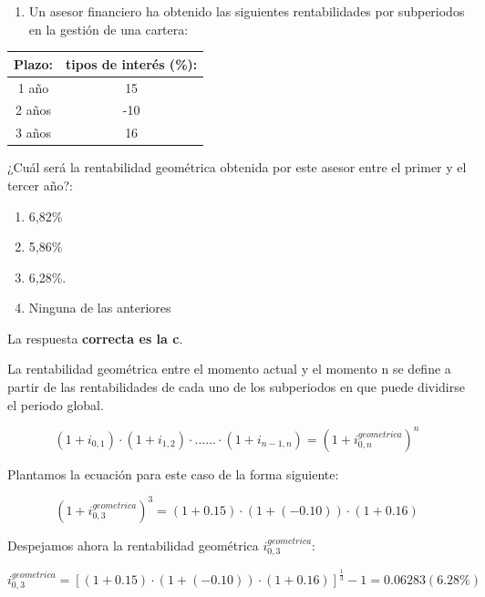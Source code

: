 \documentclass[
  letterpaper,
  DIV=11,
  numbers=noendperiod]{scrreprt}
\providecommand{\tightlist}{%
  \setlength{\itemsep}{0pt}\setlength{\parskip}{0pt}}\usepackage{longtable,booktabs,array}
\begin{document}
\begin{enumerate}
\def\labelenumi{\arabic{enumi}.}
\setcounter{enumi}{28}
\tightlist
\item
  Un asesor financiero ha obtenido las siguientes rentabilidades por
  subperiodos en la gestión de una cartera:
\end{enumerate}

\begin{longtable}[]{@{}cc@{}}
\toprule()
\textbf{Plazo:} & \textbf{tipos de interés (\%):} \\
\midrule()
\endhead
1 año & 15 \\
2 años & -10 \\
3 años & 16 \\
\bottomrule()
\end{longtable}

¿Cuál será la rentabilidad geométrica obtenida por este asesor entre el
primer y el tercer año?:

\begin{enumerate}
\def\labelenumi{\alph{enumi})}
\item
  6,82\%
\item
  5,86\%
\item
  6,28\%.
\item
  Ninguna de las anteriores
\end{enumerate}

\begin{tcolorbox}[enhanced jigsaw, left=2mm, opacityback=0, colback=white, breakable, arc=.35mm, bottomrule=.15mm, rightrule=.15mm, toprule=.15mm, leftrule=.75mm, colframe=quarto-callout-tip-color-frame]
\begin{minipage}[t]{5.5mm}
\textcolor{quarto-callout-tip-color}{\faLightbulb}
\end{minipage}%
\begin{minipage}[t]{\textwidth - 5.5mm}

La respuesta \textbf{correcta es la c}.

La rentabilidad geométrica entre el momento actual y el momento n se
define a partir de las rentabilidades de cada uno de los subperiodos en
que puede dividirse el periodo global.

\[\left(1+i_{0,1}\right)\cdot\left(1+i_{1,2}\right)\cdot......\cdot\left(1+i_{n-1,n}\right)=\left(1+i_{0,n}^{geometrica}\right)^n\]

Plantamos la ecuación para este caso de la forma siguiente:

\[\left(1+i_{0,3}^{geometrica}\right)^{3}=\left(1+0.15\right)\cdot\left(1+\left(-0.10\right)\right)\cdot\left(1+0.16\right)\]

Despejamos ahora la rentabilidad geométrica \(i_{0,3}^{geometrica}\):

\[i_{0,3}^{geometrica}=\left[\left(1+0.15\right)\cdot\left(1+\left(-0.10\right)\right)\cdot\left(1+0.16\right)\right]^{\frac{1 }{3 }}-1=0.06283(6.28\%)\]

\end{minipage}%
\end{tcolorbox}
\end{document}
